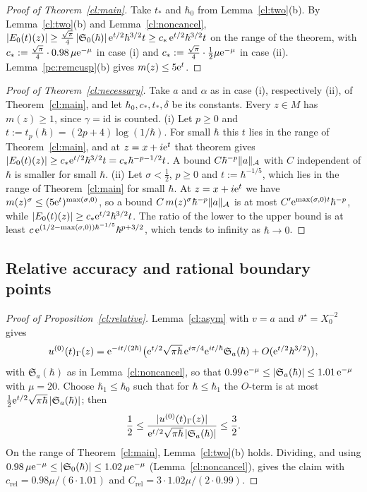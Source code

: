 \begin{proof}[Proof of Theorem~\ref{cl:main}]
Take $t_*$ and $\hbar_0$ from Lemma~\ref{cl:two}(b). By Lemma~\ref{cl:two}(b) and Lemma~\ref{cl:noncancel},
$|E_0(t)(z)|\ge\tfrac{\sqrt\pi}4\,|\mathfrak S_0(\hbar)|\,\mathrm{e}^{t/2}\hbar^{3/2}t\ge c_*\,\mathrm{e}^{t/2}\hbar^{3/2}t$ on the range of the theorem, with
$c_*:=\tfrac{\sqrt\pi}4\cdot0.98\,\mu\mathrm{e}^{-\mu}$ in case (i) and $c_*:=\tfrac{\sqrt\pi}4\cdot\tfrac12\mu\mathrm{e}^{-\mu}$ in case (ii).
Lemma~\ref{pc:remcusp}(b) gives $m(z)\le5\mathrm{e}^t$.
\end{proof}

\begin{proof}[Proof of Theorem~\ref{cl:necessary}]
Take $a$ and $\alpha$ as in case (i), respectively (ii), of Theorem~\ref{cl:main}, and let $\hbar_0,c_*,t_*,\delta$ be its constants.
Every $z\in M$ has $m(z)\ge1$, since $\gamma=\mathrm{id}$ is counted.
(i) Let $p\ge0$ and $t:=t_p(\hbar)=(2p+4)\log(1/\hbar)$. For small $\hbar$ this $t$ lies in the range of Theorem~\ref{cl:main},
and at $z=x+i\mathrm{e}^t$ that theorem gives $|E_0(t)(z)|\ge c_*\mathrm{e}^{t/2}\hbar^{3/2}t=c_*\hbar^{-p-1/2}t$. A bound
$C\hbar^{-p}\lVert a\rVert_{\mathcal A}$ with $C$ independent of $\hbar$ is smaller for small $\hbar$.
(ii) Let $\sigma<\tfrac12$, $p\ge0$ and $t:=\hbar^{-1/5}$, which lies in the range of Theorem~\ref{cl:main} for small $\hbar$. At
$z=x+i\mathrm{e}^t$ we have $m(z)^\sigma\le(5\mathrm{e}^t)^{\max(\sigma,0)}$, so a bound $C\,m(z)^\sigma\hbar^{-p}\lVert a\rVert_{\mathcal A}$ is at most
$C'\mathrm{e}^{\max(\sigma,0)t}\hbar^{-p}$, while $|E_0(t)(z)|\ge c_*\mathrm{e}^{t/2}\hbar^{3/2}t$. The ratio of the lower to the upper bound is at least
$c\,\mathrm{e}^{(1/2-\max(\sigma,0))\hbar^{-1/5}}\hbar^{p+3/2}$, which tends to infinity as $\hbar\to0$.
\end{proof}

\subsection{Relative accuracy and rational boundary points}\label{subsec:cl-relative}

\begin{proof}[Proof of Proposition~\ref{cl:relative}]
Lemma~\ref{cl:asym} with $v=a$ and $\vartheta^\star=X_0^{-2}$ gives
\[
u^{(0)}(t)_\Gamma(z)=\mathrm{e}^{-it/(2\hbar)}\bigl(\mathrm{e}^{t/2}\sqrt{\pi\hbar}\,\mathrm{e}^{i\pi/4}\mathrm{e}^{it/\hbar}\mathfrak S_a(\hbar)+O(\mathrm{e}^{t/2}\hbar^{3/2})\bigr),
\]
with $\mathfrak S_a(\hbar)$ as in Lemma~\ref{cl:noncancel}, so that $0.99\,\mathrm{e}^{-\mu}\le|\mathfrak S_a(\hbar)|\le1.01\,\mathrm{e}^{-\mu}$ with $\mu=20$. Choose $\hbar_1\le\hbar_0$
such that for $\hbar\le\hbar_1$ the $O$-term is at most $\tfrac12\mathrm{e}^{t/2}\sqrt{\pi\hbar}\,|\mathfrak S_a(\hbar)|$; then
\[
\frac12\le\frac{|u^{(0)}(t)_\Gamma(z)|}{\mathrm{e}^{t/2}\sqrt{\pi\hbar}\,|\mathfrak S_a(\hbar)|}\le\frac32 .
\]
On the range of Theorem~\ref{cl:main}, Lemma~\ref{cl:two}(b) holds. Dividing, and using
$0.98\,\mu\mathrm{e}^{-\mu}\le|\mathfrak S_0(\hbar)|\le1.02\,\mu\mathrm{e}^{-\mu}$ (Lemma~\ref{cl:noncancel}), gives the claim with
$c_{\mathrm{rel}}=0.98\mu/(6\cdot1.01)$ and $C_{\mathrm{rel}}=3\cdot1.02\mu/(2\cdot0.99)$.
\end{proof}

